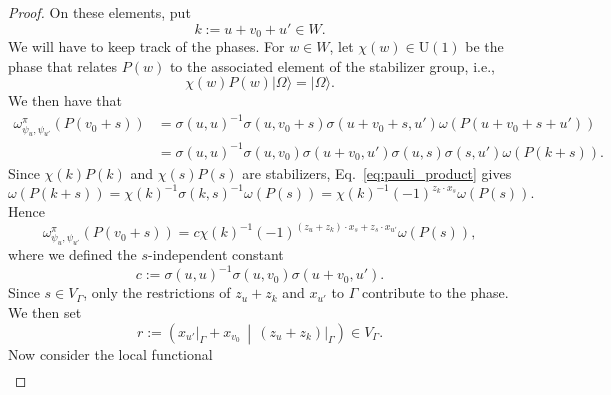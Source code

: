 \documentclass[aps,pra,reprint,superscriptaddress]{revtex4-2}
\newcommand\G{\Gamma}
\newcommand\s{\sigma}
\newcommand\w{\omega}
\newcommand\W{\Omega}
\newcommand\y{\psi}
\providecommand{\ket}[1]{\lvert #1\rangle}
\theoremstyle{definition}
\theoremstyle{remark}
\begin{document}
\begin{proof}
        On these elements, put
        \begin{equation}
            k:=u+v_0+u'\in W.
        \end{equation}
        We will have to keep track of the phases. For $w\in W$, let $\chi(w)\in
        \mathrm{U}(1)$ be the phase that relates $P(w)$ to the associated
        element of the stabilizer group, i.e.,
        \begin{equation}
            \chi(w)P(w)\ket{\W}=\ket{\W}.
        \end{equation}
        We then have that 
        \begin{align}
        \omega^\pi_{\psi_u,\psi_{u'}}(P(v_0+s))
        &=
        \sigma(u,u)^{-1}
        \sigma(u,v_0+s)
        \sigma(u+v_0+s,u')
        \omega(P(u+v_0+s+u'))\\
        &=
        \sigma(u,u)^{-1}
        \sigma(u,v_0)
        \sigma(u+v_0,u')
        \sigma(u,s)\sigma(s,u')
        \omega(P(k+s)).
        \end{align}
        Since $\chi(k)P(k)$ and $\chi(s)P(s)$ are stabilizers, Eq.~\eqref{eq:pauli_product} gives
        \begin{equation}
            \w(P(k+s))
            =
            \chi(k)^{-1}\s(k,s)^{-1}\w(P(s))
            =
            \chi(k)^{-1}(-1)^{z_k\cdot x_s}\w(P(s)).
        \end{equation}
        Hence
        \begin{equation}\label{eq:functional_global}
            \w_{\y_u,\y_{u'}}^{\pi}(P(v_0+s))
            =
            c\chi(k)^{-1}
            (-1)^{(z_u+z_k)\cdot x_s+z_s\cdot x_{u'}}
            \w(P(s)),
        \end{equation}
        where we defined the $s$-independent constant
        \begin{equation}
            c:=\s(u,u)^{-1}\s(u,v_0)\s(u+v_0,u').
        \end{equation}
        Since $s\in V_\G$, only the restrictions
        of $z_u+z_k$ and $x_{u'}$ to $\G$ contribute to the phase. We then set
        \begin{equation}
            r:=
            \left(
                x_{u'}\vert_\G+x_{v_0}
                \,\middle|\,
                (z_u+z_k)\vert_\G
            \right)
            \in V_\G.
        \end{equation}
        Now consider the local functional
        \begin{equation}\label{eq:local_functional}
            \begin{aligned}

\end{aligned}
\end{equation}
\end{proof}
\end{document}
